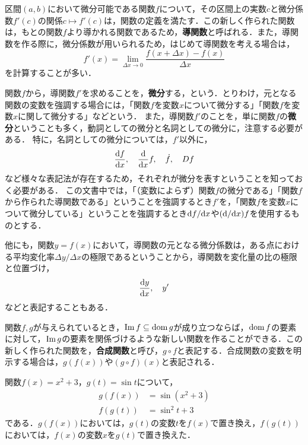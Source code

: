 \begin{definition}[導関数]
	区間$(a,b)$において\footnotemark[1]微分可能である関数$f$について，その区間上の実数$c$と微分係数$f'(c)$の関係$c \mapsto f'(c)$は，関数の定義を満たす．この新しく作られた関数は，もとの関数$f$より導かれる関数であるため，\textbf{導関数}と呼ばれる．また，導関数を作る際に，微分係数が用いられるため，はじめて導関数を考える場合は，
	\[
		f'(x) = \lim\limits_{\Delta x \to 0} \frac{f(x + \Delta x) - f(x)}{\Delta x}
	\]
	を計算することが多い．
\end{definition}
\begin{rem*}
	関数$f$から，導関数$f'$を求めることを，\textbf{微分}する，という．とりわけ，元となる関数の変数を強調する場合には，「関数$f$を変数$x$について微分する」「関数$f$を変数$x$に関して微分する」などという．
	また，導関数$f'$のことを，単に関数$f$の\textbf{微分}ということも多く，動詞としての微分と名詞としての微分に，注意する必要がある．
	特に，名詞としての微分については，$f'$以外に，
	\[
		\frac{\mathrm{d} f}{\mathrm{d} x},\quad \frac{\mathrm{d}}{\mathrm{d} x}f,\quad \dot{f},\quad Df
	\]
	など様々な表記法が存在するため，それぞれが微分を表すということを知っておく必要がある．
	この文書中では，「（変数によらず）関数$f$の微分である」「関数$f$から作られた導関数である」ということを強調するとき$f'$を，「関数$f$を変数$x$について微分している」ということを強調するとき$\mathrm{d} f/\mathrm{d} x$や$(\mathrm{d}/\mathrm{d} x) f$を使用するものとする．
	
	他にも，関数$y = f(x)$において，導関数の元となる微分係数は，ある点における平均変化率$\Delta y / \Delta x$の極限であるということから，導関数を変化量の比の極限と位置づけ，
	\[
		\frac{\mathrm{d} y}{\mathrm{d} x},\quad y'
	\]
	などと表記することもある．
\end{rem*}

\newpage
\begin{definition}[合成関数]
	関数$f, g$が与えられているとき，$\operatorname{Im} f \subseteq \operatorname{dom} g$が成り立つならば，$\operatorname{dom} f$の要素に対して，$\operatorname{Im} g$の要素を関係づけるような新しい関数を作ることができる．この新しく作られた関数を，\textbf{合成関数}と呼び，$g \circ f$と表記する．合成関数の変数を明示する場合は，$g(f(x))$や$(g \circ f)(x)$と表記される．
\end{definition}
\begin{example*}
	関数$f(x) = x^2+3$，$g(t) = \sin t$について，
	\begin{align*}
		g(f(x)) &= \sin(x^2+3) \\
		f(g(t)) &= \sin^2t + 3
	\end{align*}
	である．$g(f(x))$においては，$g(t)$の変数$t$を$f(x)$で置き換え，$f(g(t))$においては，$f(x)$の変数$x$を$g(t)$で置き換えた．
\end{example*}

